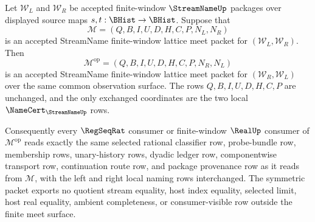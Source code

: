 \begin{lemma}
\label{lem:streamname-finite-window-lattice-meet-symmetry}
Let $\mathcal W_L$ and $\mathcal W_R$ be accepted finite-window
$\StreamNameUp$ packages over displayed source maps $s,t:\BHist\to
\BHist$. Suppose that
$$
\mathcal M=(Q,B,I,U,D,H,C,P,N_L,N_R)
$$
is an accepted StreamName finite-window lattice meet packet for
$(\mathcal W_L,\mathcal W_R)$. Then
$$
\mathcal M^{\mathrm{op}}=(Q,B,I,U,D,H,C,P,N_R,N_L)
$$
is an accepted StreamName finite-window lattice meet packet for
$(\mathcal W_R,\mathcal W_L)$ over the same common observation surface.
The rows $Q,B,I,U,D,H,C,P$ are unchanged, and the only exchanged
coordinates are the two local $\NameCert_{\StreamNameUp}$ rows.

Consequently every $\RegSeqRat$ consumer or finite-window $\RealUp$ consumer
of $\mathcal M^{\mathrm{op}}$ reads exactly the same selected rational
classifier row, probe-bundle row, membership rows, unary-history rows, dyadic
ledger row, componentwise transport row, continuation route row, and package
provenance row as it reads from $\mathcal M$, with the left and right local
naming rows interchanged. The symmetric packet exports no quotient stream
equality, host index equality, selected limit, host real equality, ambient
completeness, or consumer-visible row outside the finite meet surface.
\end{lemma}
